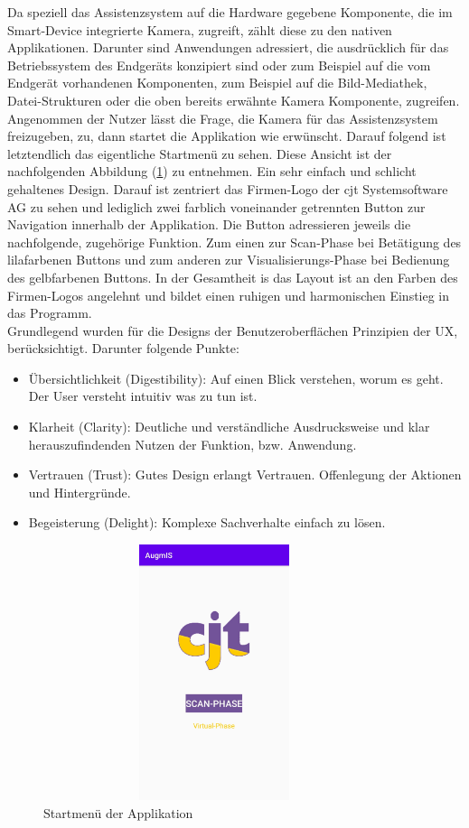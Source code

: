 Da speziell das Assistenzsystem auf die Hardware gegebene Komponente, die im Smart-Device integrierte Kamera, zugreift, zählt diese zu den nativen Applikationen. 
Darunter sind Anwendungen adressiert, die ausdrücklich für das Betriebssystem des Endgeräts konzipiert sind oder zum Beispiel auf die vom Endgerät vorhandenen Komponenten, 
zum Beispiel auf die Bild-Mediathek, Datei-Strukturen oder die oben bereits erwähnte Kamera Komponente, zugreifen.
\\ 
\linebreak
Angenommen der Nutzer lässt die Frage, die Kamera für das Assistenzsystem freizugeben, zu, dann startet die Applikation wie erwünscht. Darauf folgend ist letztendlich 
das eigentliche Startmenü zu sehen. Diese Ansicht ist der nachfolgenden Abbildung (\ref{pic:startmenu}) zu entnehmen. Ein sehr einfach und schlicht gehaltenes Design. 
Darauf ist zentriert das Firmen-Logo der cjt Systemsoftware AG zu sehen und lediglich zwei farblich voneinander getrennten Button zur Navigation innerhalb der Applikation. 
Die Button adressieren jeweils die nachfolgende, zugehörige Funktion. Zum einen 
zur Scan-Phase bei Betätigung des lilafarbenen Buttons und zum anderen zur Visualisierungs-Phase bei Bedienung des gelbfarbenen Buttons. In der Gesamtheit is das Layout 
ist an den Farben des Firmen-Logos angelehnt und bildet einen ruhigen und harmonischen Einstieg in das Programm. 
\\ 
\linebreak
Grundlegend wurden für die Designs der Benutzeroberflächen Prinzipien der \ac{UX}, berücksichtigt. Darunter folgende Punkte: 
\pagebreak
\begin{itemize}
    \item Übersichtlichkeit (Digestibility): Auf einen Blick verstehen, worum es geht. Der User versteht intuitiv was zu tun ist.
    \item Klarheit (Clarity): Deutliche und verständliche Ausdrucksweise und klar herauszufindenden Nutzen der Funktion, bzw. Anwendung.
    \item Vertrauen (Trust): Gutes Design erlangt Vertrauen. Offenlegung der Aktionen und Hintergründe. 
    \item Begeisterung (Delight): Komplexe Sachverhalte einfach zu lösen. 
\end{itemize} 
\begin{figure}[hbt!]
    \centering
    \includegraphics[width=10cm,height=7.5cm,keepaspectratio]{4Umsetzung/Bilder/startmenu.jpg}
    \caption{Startmenü der Applikation}
    \label{pic:startmenu}
\end{figure}
